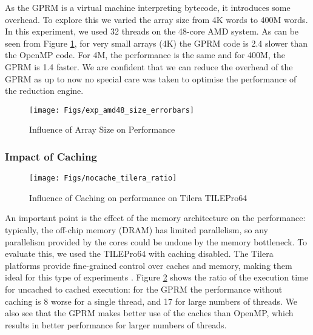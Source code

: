 \documentclass[copyright,creativecommons]{eptcs}
\begin{document}
As the GPRM is a virtual machine interpreting bytecode, it introduces
some overhead. To explore this we varied the array size from 4K words
to 400M words. In this experiment, we used 32 threads on the 48-core
AMD system. As can be seen from Figure \ref{fig:Influence-of-Array},
for very small arrays (4K) the GPRM code is 2.4 slower than
the OpenMP code. For 4M, the performance is the same and for 400M,
the GPRM is 1.4 faster. We are confident that we can reduce
the overhead of the GPRM as up to now no special care was taken to
optimise the performance of the reduction engine.

\begin{figure}[H]
\begin{centering}
\texttt{[image: Figs/exp\_amd48\_size\_errorbars]}
\par\end{centering}

\caption{\label{fig:Influence-of-Array}Influence of Array Size on Performance}
\end{figure}



\subsubsection{Impact of Caching}

\begin{figure}[H]
\begin{centering}
\texttt{[image: Figs/nocache\_tilera\_ratio]}
\par\end{centering}

\caption{\label{fig:Speedup-cache}Influence of Caching on performance on Tilera
TILEPro64}
\end{figure}


An important point is the effect of the memory architecture on the
performance: typically, the off-chip memory (DRAM) has limited parallelism,
so any parallelism provided by the cores could be undone by the memory
bottleneck. To evaluate this, we used the TILEPro64 with caching disabled.
The Tilera platforms provide fine-grained control over caches and
memory, making them ideal for this type of experiments \cite{wentzlaff2007chip}.
Figure \ref{fig:Speedup-cache} shows the ratio of the execution time
for uncached to cached execution: for the GPRM the performance without
caching is 8 worse for a single thread, and 17 for
large numbers of threads. We also see that the GPRM makes better use
of the caches than OpenMP, which results in better performance for
larger numbers of threads.
\end{document}
